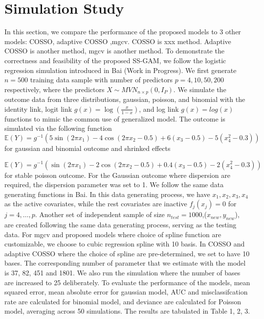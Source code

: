 \documentclass[AMA,STIX1COL,]{WileyNJD-v2}
\begin{document}
\hypertarget{simulation-study}{%
\section{Simulation Study}\label{simulation-study}}

In this section, we compare the performance of the proposed models to 3
other models: COSSO, adaptive COSSO ,mgcv. COSSO is xxx method. Adaptive
COSSO is another method, mgcv is another method. To demonstrate the
correctness and feasibility of the proposed SS-GAM, we follow the
logistic regression simulation introduced in Bai (Work in Progress). We
first generate \(n=500\) training data sample with number of predictors
\(p=4, 10, 50, 200\) respectively, where the predictors
\(X \sim MVN_{n\times p}(0, I_{P})\). We simulate the outcome data from
three distributions, gaussian, poisson, and binomial with the identity
link, logit link \(g(x) = \log(\frac{x}{1-x})\), and log link
\(g(x) = log(x)\) functions to mimic the common use of generalized
model. The outcome is simulated via the following function \[
\mathbb{E}(Y) = g^{-1}(5 \sin(2\pi x_1) - 4 \cos(2\pi x_2 -0.5) + 6(x_3-0.5) - 5(x_4^2 -0.3))
\] for gaussian and binomial outcome and shrinked effects

\[
\mathbb{E}(Y) = g^{-1}(\sin(2\pi x_1) - 2\cos(2\pi x_2 -0.5) + 0.4(x_3-0.5) - 2(x_4^2 -0.3))
\] for stable poisson outcome. For the Gaussian outcome where dispersion
are required, the dispersion parameter was set to 1. We follow the same
data generating functions in Bai. In this data generating process, we
have \(x_1, x_2, x_3, x_4\) as the active covariates, while the rest
covariates are inactive \(f_j(x_j) = 0\) for \(j = 4, \dots, p\).
Another set of independent sample of size
\(n_{test}=1000\),(\(x_{new} ,y_{new}\)), are created following the same
data generating process, serving as the testing data. For mgcv and
proposed models where choice of spline function are customizable, we
choose to cubic regression spline with 10 basis. In COSSO and adaptive
COSSO where the choice of spline are pre-determined, we set to have 10
bases. The corresponding number of parameter that we estimate with the
model is 37, 82, 451 and 1801. We also run the simulation where the
number of bases are increased to 25 deliberately. To evaluate the
performance of the models, mean squared error, mean absolute error for
gaussian model, AUC and misclassifcation rate are calculated for
binomial model, and deviance are calculated for Poisson model, averaging
across 50 simulations. The results are tabulated in Table 1, 2, 3.
\end{document}
